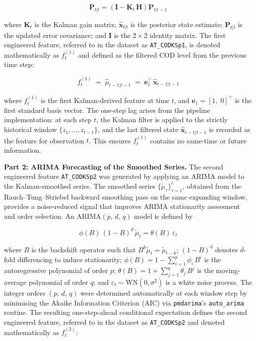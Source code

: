 \documentclass[conference]{IEEEtran}
\begin{document}
\begin{equation}
    \mathbf{P}_{t|t} = \left(\mathbf{I} - \mathbf{K}_t\,\mathbf{H}\right)\mathbf{P}_{t|t-1}
    \label{eq:kf_update_cov}
\end{equation}

where $\mathbf{K}_t$ is the Kalman gain matrix; $\hat{\mathbf{x}}_{t|t}$ is the posterior state estimate; $\mathbf{P}_{t|t}$ is the updated error covariance; and $\mathbf{I}$ is the $2\!\times\!2$ identity matrix. The first engineered feature, referred to in the dataset as \texttt{AT\_CODKSp1}, is denoted mathematically as $f^{(1)}_t$ and defined as the filtered COD level from the previous time step:

\begin{equation}
    f^{(1)}_t \;=\; \hat{\mu}_{t-1|t-1} \;=\; \mathbf{e}_1^\top\,\hat{\mathbf{x}}_{t-1|t-1}
    \label{eq:ksp1}
\end{equation}

where $f^{(1)}_t$ is the first Kalman-derived feature at time $t$, and $\mathbf{e}_1 = [1,\;0]^\top$ is the first standard basis vector. The one-step lag arises from the pipeline implementation: at each step $t$, the Kalman filter is applied to the strictly historical window $\{z_1,\ldots,z_{t-1}\}$, and the last filtered state $\hat{\mathbf{x}}_{t-1|t-1}$ is recorded as the feature for observation $t$. This ensures $f^{(1)}_t$ contains no same-time or future information.

\textbf{Part 2: ARIMA Forecasting of the Smoothed Series.}
The second engineered feature \texttt{AT\_CODKSp2} was generated by applying an ARIMA model to the Kalman-smoothed series. The smoothed series $\{\tilde{\mu}_\tau\}_{\tau=1}^{t}$, obtained from the Rauch--Tung--Striebel backward smoothing pass on the same expanding window, provides a noise-reduced signal that improves ARIMA stationarity assessment and order selection. An ARIMA$(p,\,d,\,q)$ model is defined by

\begin{equation}
    \phi(B)\,(1-B)^d\,\tilde{\mu}_t = \theta(B)\,\varepsilon_t
    \label{eq:arima}
\end{equation}

where $B$ is the backshift operator such that $B^k\tilde{\mu}_t = \tilde{\mu}_{t-k}$; $(1-B)^d$ denotes $d$-fold differencing to induce stationarity; $\phi(B) = 1 - \sum_{i=1}^{p}\phi_i\,B^i$ is the autoregressive polynomial of order $p$; $\theta(B) = 1 + \sum_{j=1}^{q}\theta_j\,B^j$ is the moving-average polynomial of order $q$; and $\varepsilon_t \sim \mathrm{WN}(0,\sigma^2)$ is a white noise process. The integer orders $(p,\,d,\,q)$ were determined automatically at each window step by minimising the Akaike Information Criterion (AIC) via \texttt{pmdarima}'s \texttt{auto\_arima} routine. The resulting one-step-ahead conditional expectation defines the second engineered feature, referred to in the dataset as \texttt{AT\_CODKSp2} and denoted mathematically as $f^{(2)}_t$:
\end{document}
